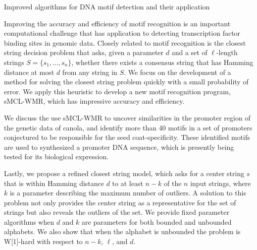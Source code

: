 Improved algorithms for DNA motif detection and their application

Improving the accuracy and efficiency of motif recognition is an important computational challenge that has application to detecting transcription factor binding sites in genomic data.  Closely related to motif recognition is the closest string decision problem that asks, given a parameter $d$ and a set of $\ell$-length strings $S = \{s_1, \ldots, s_n\}$, whether there exists a consensus string that has Hamming distance at most $d$ from any string in $S$. We focus on the development of a method for solving the closest string problem quickly with a small probability of error.  We apply this heuristic to develop a new motif recognition program, sMCL-WMR, which has impressive accuracy and efficiency. 
 
We discuss the use sMCL-WMR to uncover similarities in the promoter region of the genetic data of canola, and identify more than 40 motifs in a set of promoters conjectured to be responsible for the seed coat-specificity. These identified motifs are used to synthesized a promoter DNA sequence, which is presently being tested for its biological expression.
  
Lastly, we propose a refined closest string model, which asks for a center string $s$ that is within Hamming distance $d$ to at least $n-k$ of the $n$ input strings, where $k$ is a parameter describing the maximum number of outliers. A solution to this problem not only provides the center string as a representative for the set of strings but also reveals the outliers of the set.  We provide fixed parameter algorithms when $d$ and $k$ are parameters for both bounded and unbounded alphabets. We also show that when the alphabet is unbounded the problem is W[1]-hard with respect to $n-k$, $\ell$, and $d$.
